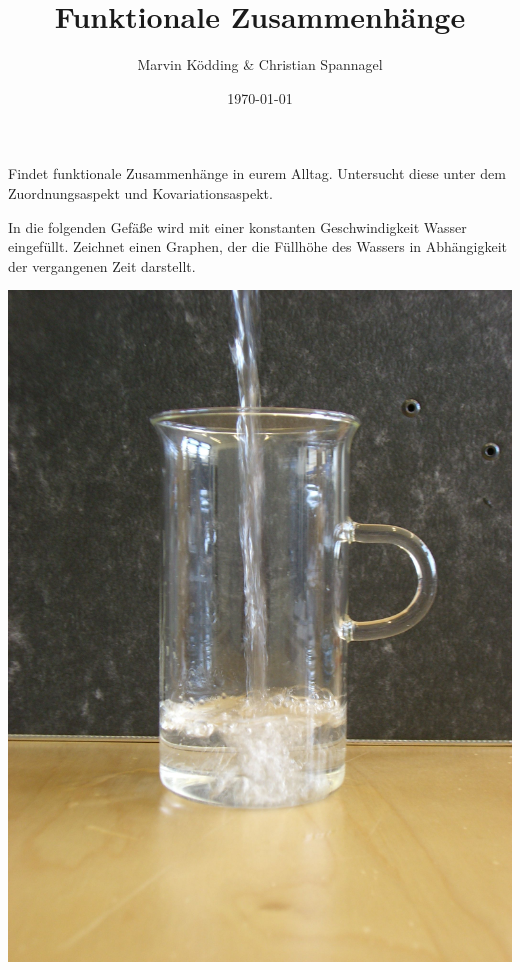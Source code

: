 \documentclass{cssheet}
\title{Funktionale Zusammenhänge}
\author{Marvin Ködding \& Christian Spannagel}
\date{\today}
\begin{document}
\printtitle

\begin{aufgabe}
	Findet funktionale Zusammenhänge in eurem Alltag. Untersucht diese unter dem Zuordnungsaspekt und Kovariationsaspekt.
\end{aufgabe}

\begin{aufgabe}[Füllgraphen]
	In die folgenden Gefäße wird mit einer konstanten \glqq{}Geschwindigkeit\grqq{} Wasser eingefüllt. Zeichnet einen Graphen, der die Füllhöhe des Wassers in Abhängigkeit der vergangenen Zeit darstellt.
	
	\begin{minipage}{.33\textwidth}
		\includegraphics[width=\linewidth]{Gefaess_A_1.jpg}
	\end{minipage}
	\begin{minipage}{.33\textwidth}

\end{minipage}
\end{aufgabe}
\end{document}
